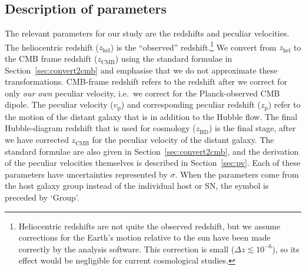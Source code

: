 \documentclass[
  journal=pasa,
  manuscript=research-paper,
  year=2022,
]{cup-journal}
\newcommand{\zCMB}[1]{\ensuremath{z_{\text{CMB}}^{\mathrm{#1}}}}
\newcommand{\zHD}[1]{\ensuremath{z_{\text{HD}}^{\mathrm{#1}}}}
\newcommand\zhel{\ensuremath{z_{\text{hel}}}}
\newcommand{\vp}{\ensuremath{v_{\text{p}}}}
\newcommand{\zp}{\ensuremath{z_{\text{p}}}}
\begin{document}
\subsection{Description of parameters}\label{subsec:description}
The relevant parameters for our study are the redshifts and peculiar velocities.
The heliocentric redshift (\zhel{}) is the ``observed'' redshift.\footnote{Heliocentric redshifts are not quite the observed redshift, but we assume corrections for the Earth's motion relative to the sun have been made correctly by the analysis software.
This correction is small ($\Delta z\lesssim10^{-6}$), so its effect would be negligible for current cosmological studies.}  
We convert from \zhel{} to the CMB frame redshift (\zCMB{}) using the standard formulae in Section~\ref{sec:convert2cmb} and emphasise that we do not approximate these transformations.
CMB-frame redshift refers to the redshift after we correct for only {\em our own} peculiar velocity, i.e.\ we correct for the Planck-observed CMB dipole.
The peculiar velocity (\vp{}) and corresponding peculiar redshift (\zp{}) refer to the motion of the distant galaxy that is in addition to the Hubble flow.
The final Hubble-diagram redshift that is used for cosmology (\zHD{}) is the final stage, after we have corrected \zCMB{} for the peculiar velocity of the distant galaxy.
The standard formulae are also given in Section~\ref{sec:convert2cmb}, and the derivation of the peculiar velocities themselves is described in Section~\ref{sec:pv}.
Each of these parameters have uncertainties represented by $\sigma$.
When the parameters come from the host galaxy group \citep[from][]{Peterson2021} instead of the individual host or SN, the symbol is preceded by `Group'.
\end{document}
